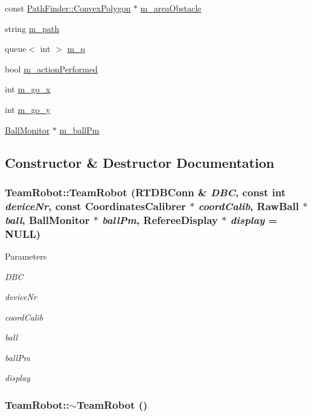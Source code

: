 \begin{DoxyCompactItemize}
\item 
const \hyperlink{structPathFinder_1_1ConvexPolygon}{PathFinder::ConvexPolygon} $\ast$ \hyperlink{classTeamRobot_af06d7a399ac2a3c24c27a7af1c6e38e5}{m\_\-areaObstacle}
\item 
string \hyperlink{classTeamRobot_af170b8d2e1b76b12f8cc83f6ec908e40}{m\_\-path}
\item 
queue$<$ int $>$ \hyperlink{classTeamRobot_a982ed6b6964c5e8b94519ef91b52c468}{m\_\-q}
\item 
bool \hyperlink{classTeamRobot_ab98a148247f0c8bbadac3cfc8fa268c8}{m\_\-actionPerformed}
\item 
int \hyperlink{classTeamRobot_ae4bafa3b5f0df155b1a45f95f6671316}{m\_\-go\_\-x}
\item 
int \hyperlink{classTeamRobot_ad0b6cee88278087238bf6fcecb419808}{m\_\-go\_\-y}
\item 
\hyperlink{classBallMonitor}{BallMonitor} $\ast$ \hyperlink{classTeamRobot_a84b5181a2fadaf7653d32f04fa04d657}{m\_\-ballPm}
\end{DoxyCompactItemize}


\subsection{Constructor \& Destructor Documentation}
\hypertarget{classTeamRobot_a4b116f58f0a1568a886d03b0c71df20c}{
\subsubsection[{TeamRobot}]{\setlength{\rightskip}{0pt plus 5cm}TeamRobot::TeamRobot (RTDBConn \& {\em DBC}, \/  const int {\em deviceNr}, \/  const {\bf CoordinatesCalibrer} $\ast$ {\em coordCalib}, \/  RawBall $\ast$ {\em ball}, \/  {\bf BallMonitor} $\ast$ {\em ballPm}, \/  {\bf RefereeDisplay} $\ast$ {\em display} = {\ttfamily NULL})}}
\label{classTeamRobot_a4b116f58f0a1568a886d03b0c71df20c}

\begin{DoxyParams}{Parameters}
\item[{\em DBC}]\item[{\em deviceNr}]\item[{\em coordCalib}]\item[{\em ball}]\item[{\em ballPm}]\item[{\em display}]\end{DoxyParams}
\hypertarget{classTeamRobot_a7be9d5161b7524cbbb6ae486ad4a1b42}{
\subsubsection[{$\sim$TeamRobot}]{\setlength{\rightskip}{0pt plus 5cm}TeamRobot::$\sim$TeamRobot ()}}
\label{classTeamRobot_a7be9d5161b7524cbbb6ae486ad4a1b42}


